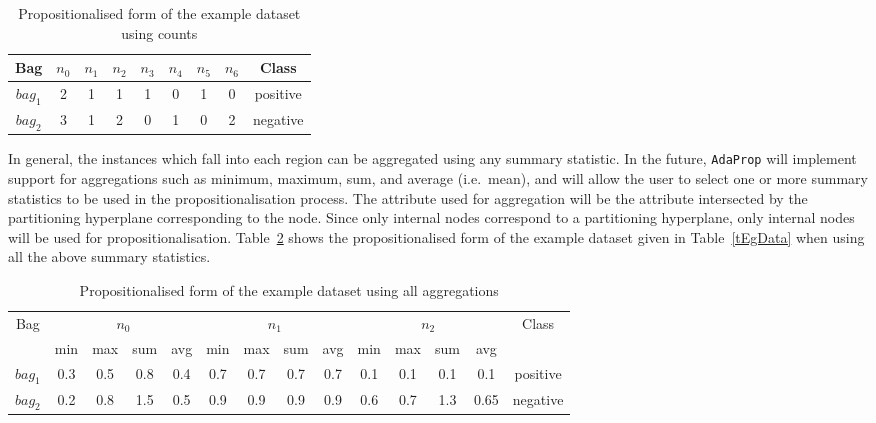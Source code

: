 \documentclass[a4paper,12pt]{article} %
\newcommand{\AdaProp}{\texttt{AdaProp}\xspace}
\begin{document}
\begin{table}
\begin{center}
\begin{tabular}{*{9}{c}}
    \toprule
    Bag & $n_0$ & $n_1$ & $n_2$ & $n_3$ & $n_4$ & $n_5$ & $n_6$ & Class \\
    \midrule
    $bag_1$ & 2 &     1 & 1 &     1 & 0 & 1 & 0 & positive\\
    $bag_2$ & 3 &     1 & 2 &     0 & 1 & 0 & 2 & negative\\
    \bottomrule
    
\end{tabular}
\end{center}
\caption{Propositionalised form of the example dataset using counts}
\label{tEgPropCount}
\end{table}    

In general, 
    the instances which fall into each region  
    can be aggregated using any summary statistic.
In the future, \AdaProp will implement support for aggregations such as 
    minimum, maximum, sum, and average (i.e.\ mean), 
    and will allow the user to select one or more summary statistics
    to be used in the propositionalisation process.
The attribute used for aggregation will be the attribute intersected
    by the partitioning hyperplane corresponding to the node.
Since only internal nodes correspond to a partitioning hyperplane, 
    only internal nodes will be used for propositionalisation.
Table~\ref{tEgPropAgg} shows the propositionalised form of 
    the example dataset given in Table~\ref{tEgData} when
    using all the above summary statistics.   
    
\begin{table}
\begin{center}
\begin{tabular}{*{14}{c}}
    \toprule
        \multirow{2}{*}{Bag} & 
        \multicolumn{4}{c}{$n_0$} & 
        \multicolumn{4}{c}{$n_1$} & 
        \multicolumn{4}{c}{$n_2$} &
        \multirow{2}{*}{Class} \\
    \cmidrule(r){2-5}
    \cmidrule(r){6-9}
    \cmidrule(r){10-13}
     & min & max & sum & avg & min & max & sum & avg & min & max & sum & avg & \\
    \midrule
    $bag_1$ &     0.3 & 0.5 & 0.8 & 0.4     & 0.7 & 0.7 & 0.7 & 0.7     & 0.1 & 0.1 & 0.1 & 0.1 & positive\\
    $bag_2$ &     0.2 & 0.8 & 1.5 & 0.5     & 0.9 & 0.9 & 0.9 & 0.9     & 0.6 & 0.7 & 1.3 & 0.65 & negative\\
    \bottomrule
    
\end{tabular}
\end{center}
\caption{Propositionalised form of the example dataset using all aggregations}
\label{tEgPropAgg}
\end{table}    
\end{document}
